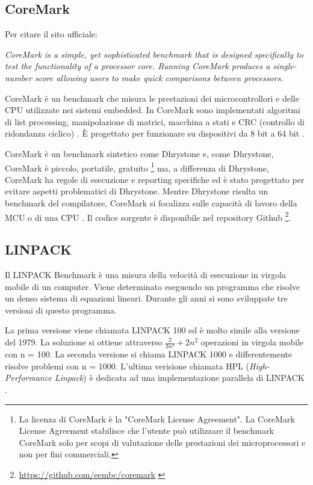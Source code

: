 \documentclass[12pt, a4paper]{report}
\begin{document}
\subsection{CoreMark}
Per citare il sito ufficiale: 

\textit{CoreMark is a simple, yet sophisticated benchmark that is designed specifically to test the functionality of a processor core. Running CoreMark produces a single-number score allowing users to make quick comparisons between processors}. 

CoreMark è un benchmark che misura le prestazioni dei microcontrollori e delle CPU utilizzate nei sistemi embedded. In CoreMark sono implementati algoritmi di list processing, manipolazione di matrici, macchina a stati e CRC (controllo di ridondanza ciclico) . È progettato per funzionare su dispositivi da 8 bit a 64 bit \cite{CoreMark}.

CoreMark è un benchmark sintetico come Dhrystone e, come Dhrystone, CoreMark è piccolo, portatile, gratuito \footnote{La licenza di CoreMark è la "CoreMark License Agreement". La CoreMark License Agreement stabilisce che l'utente può utilizzare il benchmark CoreMark solo per scopi di valutazione delle prestazioni dei microprocessori e non per fini commerciali.} ma, a differenza di Dhrystone, CoreMark ha regole di esecuzione e reporting specifiche ed è stato progettato per evitare aspetti problematici di Dhrystone. Mentre Dhrystone risulta un benchmark del compilatore, CoreMark si focalizza sulle capacità di lavoro della MCU o di una CPU \cite{analysis_EEMBC}.
Il codice sorgente è disponibile nel repository Github \footnote{\url{https://github.com/eembc/coremark} \cite{RepoCoreMark}}.
		

\subsection{LINPACK}
Il LINPACK Benchmark è una misura della velocità di esecuzione in virgola mobile di un computer. Viene determinato eseguendo un programma che risolve un denso sistema di equazioni lineari. Durante gli anni si sono sviluppate tre versioni di questo programma. 

La prima versione viene chiamata LINPACK 100 ed è molto simile alla versione del 1979. La soluzione si ottiene attraverso $ \frac{2}{3n^3} + 2n^2 $ operazioni in virgola mobile con n = 100. La seconda versione si chiama LINPACK 1000 e differentemente risolve problemi con n = 1000. L'ultima verisione chiamata HPL (\textit{High-Performance Linpack}) è dedicata ad una implementazione parallela di LINPACK\cite{LINPACK_PastPresFut} \cite{hplNetLib}.
\end{document}

